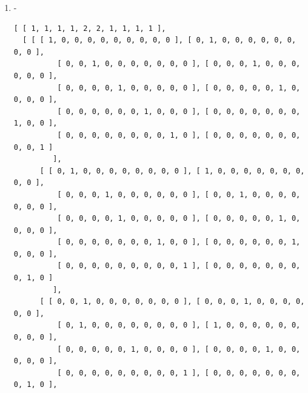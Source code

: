 \documentclass[a4paper, 10pt]{book}
\theoremstyle{definition}
\numberwithin{equation}{chapter}
\begin{document}
\begin{appendices}
\begin{enumerate}
\begin{lstlisting}[numbers=none]
          [ 0, 0, 0, 1, 0, 0, 0, 0, 0, 0 ], [ 0, 0, 0, 0, 1, 0, 0, 0, 0, 0 ] 
         ], 
      [ [ 0, 0, 0, 0, 0, 0, 0, 1, 0, 0 ], [ 0, 0, 0, 0, 0, 0, 0, 1, 0, 0 ], 
          [ 1, 1, 0, 1, 1, 0, 0, 0, 0, 0 ], [ 0, 0, 0, 0, 0, 0, 0, 1, 0, 0 ],
          [ 0, 0, 0, 0, 0, 0, 0, 1, 0, 0 ], [ 0, 0, 1, 0, 0, 0, 0, 0, 0, 0 ],
          [ 0, 0, 1, 0, 0, 0, 0, 0, 0, 0 ], [ 0, 0, 0, 0, 0, 1, 1, 0, 1, 1 ],
          [ 0, 0, 1, 0, 0, 0, 0, 0, 0, 0 ], [ 0, 0, 1, 0, 0, 0, 0, 0, 0, 0 ] 
         ], 
      [ [ 0, 0, 0, 0, 0, 0, 0, 0, 1, 0 ], [ 0, 0, 0, 0, 0, 0, 0, 0, 0, 1 ], 
          [ 0, 0, 0, 0, 0, 0, 0, 1, 0, 0 ], [ 0, 0, 0, 0, 0, 1, 0, 0, 0, 0 ],
          [ 0, 0, 0, 0, 0, 0, 1, 0, 0, 0 ], [ 0, 0, 0, 0, 1, 0, 0, 0, 0, 0 ],
          [ 0, 0, 0, 1, 0, 0, 0, 0, 0, 0 ], [ 0, 0, 1, 0, 0, 0, 0, 0, 0, 0 ],
          [ 0, 1, 0, 0, 0, 0, 0, 0, 0, 0 ], [ 1, 0, 0, 0, 0, 0, 0, 0, 0, 0 ] 
         ], 
      [ [ 0, 0, 0, 0, 0, 0, 0, 0, 0, 1 ], [ 0, 0, 0, 0, 0, 0, 0, 0, 1, 0 ], 
          [ 0, 0, 0, 0, 0, 0, 0, 1, 0, 0 ], [ 0, 0, 0, 0, 0, 0, 1, 0, 0, 0 ],
          [ 0, 0, 0, 0, 0, 1, 0, 0, 0, 0 ], [ 0, 0, 0, 1, 0, 0, 0, 0, 0, 0 ],
          [ 0, 0, 0, 0, 1, 0, 0, 0, 0, 0 ], [ 0, 0, 1, 0, 0, 0, 0, 0, 0, 0 ],
          [ 1, 0, 0, 0, 0, 0, 0, 0, 0, 0 ], [ 0, 1, 0, 0, 0, 0, 0, 0, 0, 0 ] 
         ] ] ]
	\end{lstlisting}
	\item -\begin{lstlisting}[numbers=none]
	[ [ 1, 1, 1, 1, 2, 2, 1, 1, 1, 1 ], 
  [ [ [ 1, 0, 0, 0, 0, 0, 0, 0, 0, 0 ], [ 0, 1, 0, 0, 0, 0, 0, 0, 0, 0 ], 
          [ 0, 0, 1, 0, 0, 0, 0, 0, 0, 0 ], [ 0, 0, 0, 1, 0, 0, 0, 0, 0, 0 ],
          [ 0, 0, 0, 0, 1, 0, 0, 0, 0, 0 ], [ 0, 0, 0, 0, 0, 1, 0, 0, 0, 0 ],
          [ 0, 0, 0, 0, 0, 0, 1, 0, 0, 0 ], [ 0, 0, 0, 0, 0, 0, 0, 1, 0, 0 ],
          [ 0, 0, 0, 0, 0, 0, 0, 0, 1, 0 ], [ 0, 0, 0, 0, 0, 0, 0, 0, 0, 1 ] 
         ], 
      [ [ 0, 1, 0, 0, 0, 0, 0, 0, 0, 0 ], [ 1, 0, 0, 0, 0, 0, 0, 0, 0, 0 ], 
          [ 0, 0, 0, 1, 0, 0, 0, 0, 0, 0 ], [ 0, 0, 1, 0, 0, 0, 0, 0, 0, 0 ],
          [ 0, 0, 0, 0, 1, 0, 0, 0, 0, 0 ], [ 0, 0, 0, 0, 0, 1, 0, 0, 0, 0 ],
          [ 0, 0, 0, 0, 0, 0, 0, 1, 0, 0 ], [ 0, 0, 0, 0, 0, 0, 1, 0, 0, 0 ],
          [ 0, 0, 0, 0, 0, 0, 0, 0, 0, 1 ], [ 0, 0, 0, 0, 0, 0, 0, 0, 1, 0 ] 
         ], 
      [ [ 0, 0, 1, 0, 0, 0, 0, 0, 0, 0 ], [ 0, 0, 0, 1, 0, 0, 0, 0, 0, 0 ], 
          [ 0, 1, 0, 0, 0, 0, 0, 0, 0, 0 ], [ 1, 0, 0, 0, 0, 0, 0, 0, 0, 0 ],
          [ 0, 0, 0, 0, 0, 1, 0, 0, 0, 0 ], [ 0, 0, 0, 0, 1, 0, 0, 0, 0, 0 ],
          [ 0, 0, 0, 0, 0, 0, 0, 0, 0, 1 ], [ 0, 0, 0, 0, 0, 0, 0, 0, 1, 0 ],

\end{lstlisting}
\end{enumerate}
\end{appendices}
\end{document}

